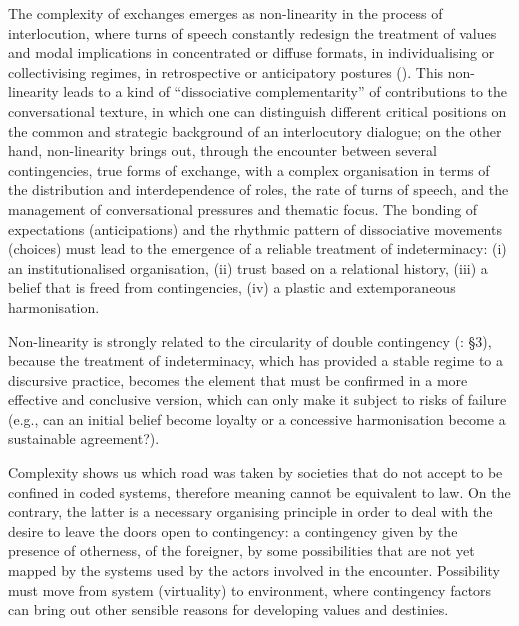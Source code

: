 \documentclass[output=paper]{langscibook}
\begin{document}
The complexity of exchanges emerges as non-linearity in the process of interlocution, where turns of speech constantly redesign the treatment of values and modal implications in concentrated or diffuse formats, in individualising or collectivising regimes, in retrospective or anticipatory postures (). This non-linearity leads to a kind of “dissociative complementarity” of contributions to the conversational texture, in which one can distinguish different critical positions on the common and strategic background of an interlocutory dialogue; on the other hand, non-linearity brings out, through the encounter between several contingencies, true forms of exchange, with a complex organisation in terms of the distribution and interdependence of roles, the rate of turns of speech, and the management of conversational pressures and thematic focus. The bonding of expectations (anticipations) and the rhythmic pattern of dissociative movements (choices) must lead to the emergence of a reliable treatment of indeterminacy: (i) an institutionalised organisation, (ii) trust based on a relational history, (iii) a belief that is freed from contingencies, (iv) a plastic and extemporaneous harmonisation.

Non-linearity is strongly related to the circularity of double contingency (\citealt{Luhmann1984}: §3), because the treatment of indeterminacy, which has provided a stable regime to a discursive practice, becomes the element that must be confirmed in a more effective and conclusive version, which can only make it subject to risks of failure (e.g., can an initial belief become loyalty or a concessive harmonisation become a sustainable agreement?).

Complexity shows us which road was taken by societies that do not accept to be confined in coded systems, therefore meaning cannot be equivalent to law. On the contrary, the latter is a necessary organising principle in order to deal with the desire to leave the doors open to contingency: a contingency given by the presence of otherness, of the foreigner, by some possibilities that are not yet mapped by the systems used by the actors involved in the encounter. Possibility must move from system (virtuality) to environment, where contingency factors can bring out other sensible reasons for developing values and destinies.\largerpage
\end{document}
